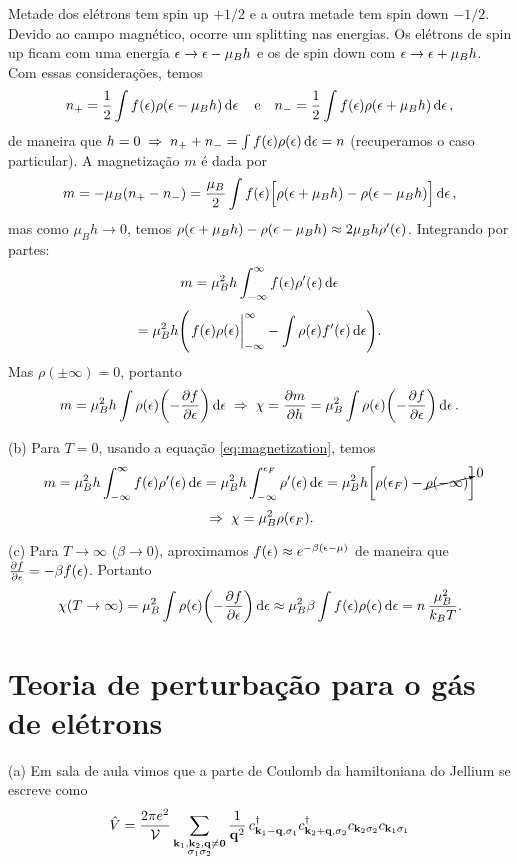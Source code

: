 \documentclass[a4paper,10pt]{article}
\begin{document}
Metade dos elétrons tem spin up $+1/2$ e a outra metade tem spin down $-1/2$. Devido ao campo magnético, ocorre um splitting nas energias. Os elétrons de spin up ficam com uma energia $\epsilon \to \epsilon - \mu_B h$ e os de spin down com $\epsilon \to \epsilon + \mu_B h$. Com essas considerações, temos
$$
n_+ = \frac{1}{2} \int f(\epsilon) \rho(\epsilon - \mu_B h) \dd{\epsilon} \quad \mathrm{e} \quad
n_- = \frac{1}{2} \int f(\epsilon) \rho(\epsilon + \mu_B h) \dd{\epsilon},
$$
de maneira que $h = 0 \; \Rightarrow \; n_+ + n_- = \int f(\epsilon) \rho(\epsilon) \dd{\epsilon} = n$ (recuperamos o caso particular). A magnetização $m$ é dada por
$$
m = - \mu_B (n_+ - n_-) =
\frac{\mu_B}{2} \int f(\epsilon) \Big[ \rho(\epsilon + \mu_B h) - \rho(\epsilon - \mu_B h) \Big] \dd{\epsilon},
$$
mas como $\mu_B h \to 0$, temos $\rho(\epsilon + \mu_B h) - \rho(\epsilon - \mu_B h) \approx 2 \mu_B h \rho'(\epsilon)$. Integrando por partes:
\begin{equation} \label{eq:magnetization}
m = \mu_B^2 h \int_{-\infty}^{\infty} f(\epsilon) \rho'(\epsilon) \dd{\epsilon}
\end{equation}
$$
= \mu_B^2 h \qty(\eval{f(\eps) \rho(\eps)}_{-\infty}^{\infty} - \int \rho(\eps) f'(\eps) \dd{\eps} ).
$$
Mas $\rho(\pm\infty) = 0$, portanto
$$
m = \mu_B^2 h \int \rho(\epsilon) \qty(- \pdv{f}{\epsilon}) \dd{\epsilon} \; \Rightarrow \;
\chi = \pdv{m}{h} = \mu_B^2 \int \rho(\epsilon) \qty(- \pdv{f}{\epsilon}) \dd{\epsilon}.
$$

(b) Para $T = 0$, usando a equação \ref{eq:magnetization}, temos
$$
m = \mu_B^2 h \int_{-\infty}^{\infty} f(\epsilon) \rho'(\epsilon) \dd{\epsilon} =
\mu_B^2 h \int_{-\infty}^{\epsilon_F} \rho'(\epsilon) \dd{\epsilon} =
\mu_B^2 h \qty[ \rho(\epsilon_F) - \cancelto{0}{\rho(-\infty)} ]
$$
$$
\; \Rightarrow \; \chi = \mu_B^2 \rho(\epsilon_F).
$$

(c) Para $T \to \infty$ ($\beta \to 0$), aproximamos $f(\epsilon) \approx e^{-\beta(\epsilon - \mu)}$ de maneira que $\pdv{f}{\epsilon} = -\beta f(\epsilon)$. Portanto
$$
\chi(T \to \infty) = \mu_B^2 \int \rho(\epsilon) \qty(- \pdv{f}{\epsilon}) \dd{\epsilon} \approx
\mu_B^2 \beta \int f(\epsilon) \rho(\epsilon) \dd{\epsilon} = n \, \frac{\mu_B^2}{k_B T}.
$$


\pagebreak


\section{Teoria de perturbação para o gás de elétrons} \label{sec:pert}

(a) Em sala de aula vimos que a parte de Coulomb da hamiltoniana do Jellium se escreve como
\begin{equation} \label{eq:jellium}
\hat{V} = \frac{2 \pi e^2}{\mathcal{V}}
\sum_{\substack{\vb{k}_1, \vb{k}_2, \vb{q} \neq \vb{0} \\ \sigma_1 \sigma_2}} \frac{1}{\vb{q}^2} \,
c_{\vb{k}_1 - \vb{q}, \sigma_1}^\dagger c_{\vb{k}_2 + \vb{q}, \sigma_2}^\dagger c_{\vb{k}_2 \sigma_2} c_{\vb{k}_1 \sigma_1}
\end{equation}
\end{document}
